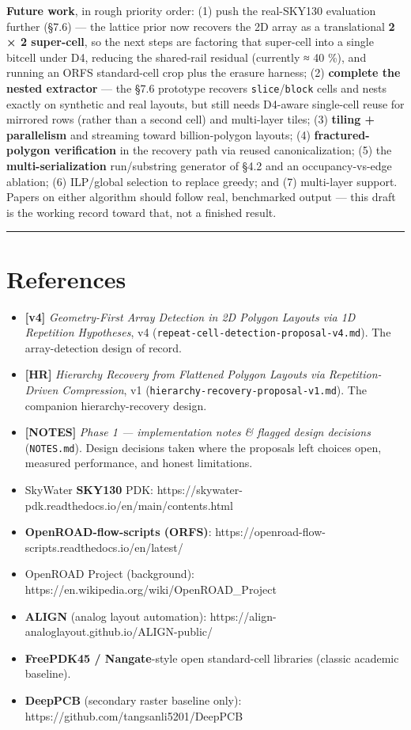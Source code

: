 \documentclass[
  11pt,
]{article}
\providecommand{\tightlist}{%
  \setlength{\itemsep}{0pt}\setlength{\parskip}{0pt}}
\begin{document}
\textbf{Future work}, in rough priority order: (1) push the real-SKY130
evaluation further (§7.6) --- the lattice prior now recovers the 2D
array as a translational \textbf{2 × 2 super-cell}, so the next steps
are factoring that super-cell into a single bitcell under D4, reducing
the shared-rail residual (currently ≈ 40 \%), and running an ORFS
standard-cell crop plus the erasure harness; (2) \textbf{complete the
nested extractor} --- the §7.6 prototype recovers
\texttt{slice}/\texttt{block} cells and nests exactly on synthetic and
real layouts, but still needs D4-aware single-cell reuse for mirrored
rows (rather than a second cell) and multi-layer tiles; (3)
\textbf{tiling + parallelism} and streaming toward billion-polygon
layouts; (4) \textbf{fractured-polygon verification} in the recovery
path via reused canonicalization; (5) the \textbf{multi-serialization}
run/substring generator of §4.2 and an occupancy-vs-edge ablation; (6)
ILP/global selection to replace greedy; and (7) multi-layer support.
Papers on either algorithm should follow real, benchmarked output ---
this draft is the working record toward that, not a finished result.

\begin{center}\rule{0.5\linewidth}{0.5pt}\end{center}

\section{References}\label{references}

\begin{itemize}
\tightlist
\item
  \textbf{{[}v4{]}} \emph{Geometry-First Array Detection in 2D Polygon
  Layouts via 1D Repetition Hypotheses}, v4
  (\texttt{repeat-cell-detection-proposal-v4.md}). The array-detection
  design of record.
\item
  \textbf{{[}HR{]}} \emph{Hierarchy Recovery from Flattened Polygon
  Layouts via Repetition-Driven Compression}, v1
  (\texttt{hierarchy-recovery-proposal-v1.md}). The companion
  hierarchy-recovery design.
\item
  \textbf{{[}NOTES{]}} \emph{Phase 1 --- implementation notes \& flagged
  design decisions} (\texttt{NOTES.md}). Design decisions taken where
  the proposals left choices open, measured performance, and honest
  limitations.
\item
  SkyWater \textbf{SKY130} PDK:
  https://skywater-pdk.readthedocs.io/en/main/contents.html
\item
  \textbf{OpenROAD-flow-scripts (ORFS)}:
  https://openroad-flow-scripts.readthedocs.io/en/latest/
\item
  OpenROAD Project (background):
  https://en.wikipedia.org/wiki/OpenROAD\_Project
\item
  \textbf{ALIGN} (analog layout automation):
  https://align-analoglayout.github.io/ALIGN-public/
\item
  \textbf{FreePDK45 / Nangate}-style open standard-cell libraries
  (classic academic baseline).
\item
  \textbf{DeepPCB} (secondary raster baseline only):
  https://github.com/tangsanli5201/DeepPCB
\end{itemize}
\end{document}
